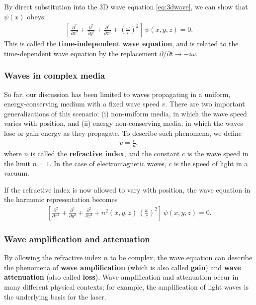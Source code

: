 \documentclass[10pt,a4paper]{article}
\begin{document}
By direct substitution into the 3D wave equation \eqref{eq:3dwave}, we
can show that $\psi(x)$ obeys
\begin{align}
  \left[\frac{\partial^2}{\partial x^2} + \frac{\partial^2}{\partial y^2} + \frac{\partial^2}{\partial z^2} + \left(\frac{\omega}{v}\right)^2\right] \, \psi(x,y,z) = 0.
\end{align}
This is called the \textbf{time-independent wave equation}, and is
related to the time-dependent wave equation by the replacement
$\partial/\partial t \rightarrow -i\omega$.

\subsubsection{Waves in complex media}
\label{waves-in-complex-media}

So far, our discussion has been limited to waves propagating in a
uniform, energy-conserving medium with a fixed wave speed $v$. There
are two important generalizations of this scenario: (i) non-uniform
media, in which the wave speed varies with position, and (ii) energy
non-conserving media, in which the waves lose or gain energy as they
propagate. To describe such phenomena, we define
\begin{align}
  v = \frac{c}{n},
\end{align}
where $n$ is called the \textbf{refractive index}, and the constant
$c$ is the wave speed in the limit $n = 1$.  In the case of
electromagnetic waves, $c$ is the speed of light in a vacuum.

If the refractive index is now allowed to vary with position, the wave
equation in the harmonic representation becomes
\begin{align}
  \left[\frac{\partial^2}{\partial x^2} + \frac{\partial^2}{\partial y^2} + \frac{\partial^2}{\partial z^2} + n^2(x,y,z)\, \left(\frac{\omega}{c}\right)^2\right] \, \psi(x,y,z) = 0.
\end{align}

\subsubsection{Wave amplification and attenuation}
\label{gainloss}

By allowing the refractive index $n$ to be complex, the wave equation
can describe the phenomena of \textbf{wave amplification} (which is
also called \textbf{gain}) and \textbf{wave attenuation} (also called
\textbf{loss}). Wave amplification and attenuation occur in many
different physical contexts; for example, the amplification of light
waves is the underlying basis for the laser.
\end{document}
